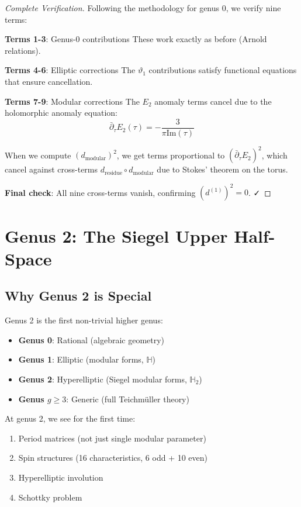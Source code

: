 \begin{proof}[Complete Verification]

Following the methodology for genus 0, we verify nine terms:

\textbf{Terms 1-3}: Genus-0 contributions
These work exactly as before (Arnold relations).

\textbf{Terms 4-6}: Elliptic corrections
The $\vartheta_1$ contributions satisfy functional equations that ensure cancellation.

\textbf{Terms 7-9}: Modular corrections
The $E_2$ anomaly terms cancel due to the holomorphic anomaly equation:
\begin{equation}
\bar{\partial}_\tau E_2(\tau) = -\frac{3}{\pi \text{Im}(\tau)}
\end{equation}

When we compute $(d_{\text{modular}})^2$, we get terms proportional to $(\bar{\partial}_\tau E_2)^2$,
which cancel against cross-terms $d_{\text{residue}} \circ d_{\text{modular}}$ due to Stokes' theorem
on the torus.

\textbf{Final check}: All nine cross-terms vanish, confirming $(d^{(1)})^2 = 0$. ✓
\end{proof}

\section{Genus 2: The Siegel Upper Half-Space}
\label{sec:genus-2-complete}

\subsection{Why Genus 2 is Special}

\begin{principle}
\label{princ:genus2-special}
Genus 2 is the first non-trivial higher genus:
\begin{itemize}
\item \textbf{Genus 0}: Rational (algebraic geometry)
\item \textbf{Genus 1}: Elliptic (modular forms, $\mathbb{H}$)
\item \textbf{Genus 2}: Hyperelliptic (Siegel modular forms, $\mathbb{H}_2$)
\item \textbf{Genus $g \geq 3$}: Generic (full Teichmüller theory)
\end{itemize}

At genus 2, we see for the first time:
\begin{enumerate}
\item Period matrices (not just single modular parameter)
\item Spin structures (16 characteristics, 6 odd + 10 even)
\item Hyperelliptic involution
\item Schottky problem
\end{enumerate}
\end{principle}

